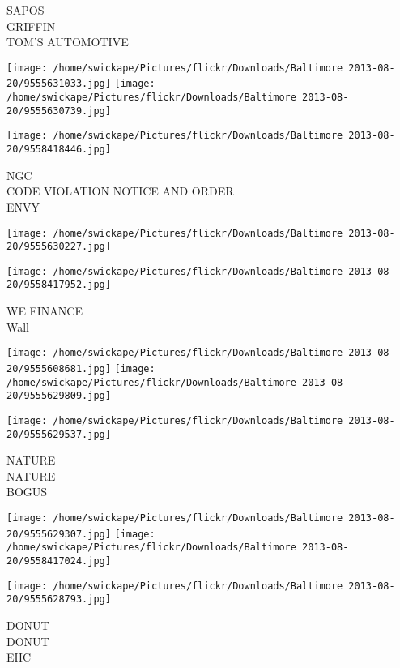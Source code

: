 \documentclass[10pt,letterpaper]{article}
\begin{document}
SAPOS\\
GRIFFIN\\
TOM'S AUTOMOTIVE\\
\pagebreak

\texttt{[image: /home/swickape/Pictures/flickr/Downloads/Baltimore 2013-08-20/9555631033.jpg]}
\texttt{[image: /home/swickape/Pictures/flickr/Downloads/Baltimore 2013-08-20/9555630739.jpg]}

\vspace{0.25in}
\texttt{[image: /home/swickape/Pictures/flickr/Downloads/Baltimore 2013-08-20/9558418446.jpg]}

NGC\\
CODE VIOLATION NOTICE AND ORDER\\
ENVY\\
\pagebreak

\texttt{[image: /home/swickape/Pictures/flickr/Downloads/Baltimore 2013-08-20/9555630227.jpg]}

\vspace{0.25in}
\texttt{[image: /home/swickape/Pictures/flickr/Downloads/Baltimore 2013-08-20/9558417952.jpg]}

WE FINANCE\\
Wall\\
\pagebreak

\texttt{[image: /home/swickape/Pictures/flickr/Downloads/Baltimore 2013-08-20/9555608681.jpg]}
\texttt{[image: /home/swickape/Pictures/flickr/Downloads/Baltimore 2013-08-20/9555629809.jpg]}

\vspace{0.25in}
\texttt{[image: /home/swickape/Pictures/flickr/Downloads/Baltimore 2013-08-20/9555629537.jpg]}

NATURE\\
NATURE\\
BOGUS\\
\pagebreak

\texttt{[image: /home/swickape/Pictures/flickr/Downloads/Baltimore 2013-08-20/9555629307.jpg]}
\texttt{[image: /home/swickape/Pictures/flickr/Downloads/Baltimore 2013-08-20/9558417024.jpg]}

\vspace{0.25in}
\texttt{[image: /home/swickape/Pictures/flickr/Downloads/Baltimore 2013-08-20/9555628793.jpg]}

DONUT\\
DONUT\\
EHC\\
\pagebreak
\end{document}
